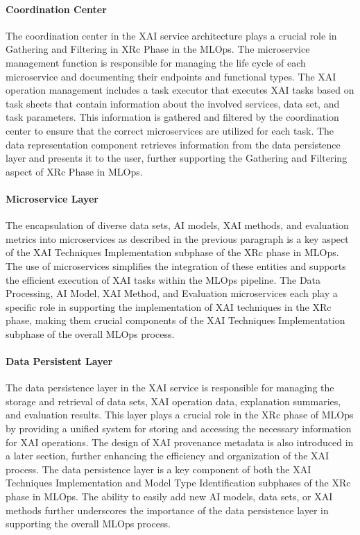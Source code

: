 \documentclass[conference]{IEEEtran}
\begin{document}
\paragraph{Coordination Center} The coordination center in the XAI service architecture plays a crucial role in Gathering and Filtering in XRc Phase in the MLOps. The microservice management function is responsible for managing the life cycle of each microservice and documenting their endpoints and functional types. The XAI operation management includes a task executor that executes XAI tasks based on task sheets that contain information about the involved services, data set, and task parameters. This information is gathered and filtered by the coordination center to ensure that the correct microservices are utilized for each task. The data representation component retrieves information from the data persistence layer and presents it to the user, further supporting the Gathering and Filtering aspect of XRc Phase in MLOps.
\paragraph{Microservice Layer} The encapsulation of diverse data sets, AI models, XAI methods, and evaluation metrics into microservices as described in the previous paragraph is a key aspect of the XAI Techniques Implementation subphase of the XRc phase in MLOps. The use of microservices simplifies the integration of these entities and supports the efficient execution of XAI tasks within the MLOps pipeline. The Data Processing, AI Model, XAI Method, and Evaluation microservices each play a specific role in supporting the implementation of XAI techniques in the XRc phase, making them crucial components of the XAI Techniques Implementation subphase of the overall MLOps process.
\paragraph{Data Persistent Layer} The data persistence layer in the XAI service is responsible for managing the storage and retrieval of data sets, XAI operation data, explanation summaries, and evaluation results. This layer plays a crucial role in the XRc phase of MLOps by providing a unified system for storing and accessing the necessary information for XAI operations. The design of XAI provenance metadata is also introduced in a later section, further enhancing the efficiency and organization of the XAI process. The data persistence layer is a key component of both the XAI Techniques Implementation and Model Type Identification subphases of the XRc phase in MLOps. The ability to easily add new AI models, data sets, or XAI methods further underscores the importance of the data persistence layer in supporting the overall MLOps process.
\end{document}
